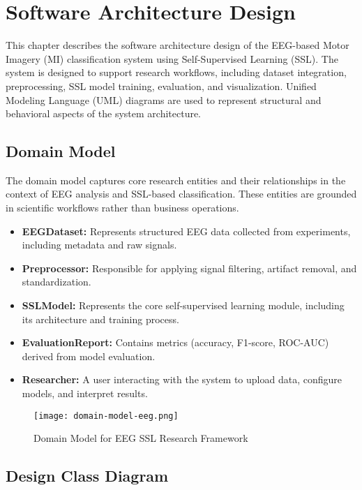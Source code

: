 \chapter{Software Architecture Design}
\label{ch:software-architecture-design}

This chapter describes the software architecture design of the EEG-based Motor Imagery (MI) classification system using Self-Supervised Learning (SSL). The system is designed to support research workflows, including dataset integration, preprocessing, SSL model training, evaluation, and visualization. Unified Modeling Language (UML) diagrams are used to represent structural and behavioral aspects of the system architecture.

\section{Domain Model}
\label{sec:domain-model}

The domain model captures core research entities and their relationships in the context of EEG analysis and SSL-based classification. These entities are grounded in scientific workflows rather than business operations.

\begin{itemize}
    \item \textbf{EEGDataset:} Represents structured EEG data collected from experiments, including metadata and raw signals.
    \item \textbf{Preprocessor:} Responsible for applying signal filtering, artifact removal, and standardization.
    \item \textbf{SSLModel:} Represents the core self-supervised learning module, including its architecture and training process.
    \item \textbf{EvaluationReport:} Contains metrics (accuracy, F1-score, ROC-AUC) derived from model evaluation.
    \item \textbf{Researcher:} A user interacting with the system to upload data, configure models, and interpret results.
\end{itemize}

\begin{figure}[H]
    \centering
    \texttt{[image: domain-model-eeg.png]}
    \caption{Domain Model for EEG SSL Research Framework}
    \label{fig:figure9}
\end{figure}

\section{Design Class Diagram}
\label{sec:design-class-diagram}

